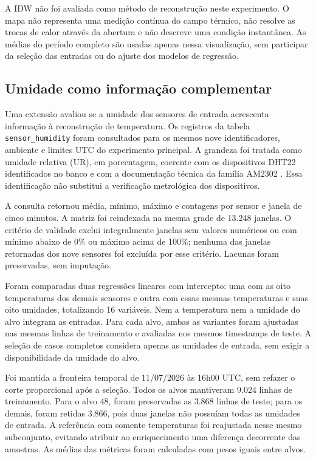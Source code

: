 A IDW não foi avaliada como método de reconstrução neste experimento.
O mapa não representa uma medição contínua do campo térmico, não
resolve as trocas de calor através da abertura e não descreve uma
condição instantânea. As médias do período completo são usadas apenas
nessa visualização, sem participar da seleção das entradas ou do ajuste
dos modelos de regressão.

\subsection{Umidade como informação complementar}
\label{subsec:metodologia_umidade}

Uma extensão avaliou se a umidade dos sensores de entrada acrescenta
informação à reconstrução de temperatura. Os registros da tabela
\texttt{sensor\_humidity} foram consultados para os mesmos nove
identificadores, ambiente e limites UTC do experimento principal.
A grandeza foi tratada como umidade relativa (UR), em porcentagem,
coerente com os dispositivos DHT22 identificados no banco e com a
documentação técnica da família AM2302 \cite{aosongam2302}.
Essa identificação não substitui a verificação metrológica dos dispositivos.

A consulta retornou média, mínimo, máximo e contagens por sensor e
janela de cinco minutos. A matriz foi reindexada na mesma grade de
13.248 janelas. O critério de validade exclui integralmente janelas
sem valores numéricos ou com mínimo abaixo de 0\% ou máximo acima
de 100\%; nenhuma das janelas retornadas dos nove sensores foi
excluída por esse critério. Lacunas foram preservadas, sem imputação.

Foram comparadas duas regressões lineares com intercepto: uma com
as oito temperaturas dos demais sensores e outra com essas mesmas
temperaturas e suas oito umidades, totalizando 16 variáveis. Nem a
temperatura nem a umidade do alvo integram as entradas. Para cada
alvo, ambas as variantes foram ajustadas nas mesmas linhas de
treinamento e avaliadas nos mesmos timestamps de teste. A seleção
de casos completos considera apenas as umidades de entrada,
sem exigir a disponibilidade da umidade do alvo.

Foi mantida a fronteira temporal de 11/07/2026 às 16h00 UTC, sem
refazer o corte proporcional após a seleção. Todos os alvos mantiveram
9.024 linhas de treinamento. Para o alvo 48, foram preservadas as
3.868 linhas de teste; para os demais, foram retidas 3.866, pois duas
janelas não possuíam todas as umidades de entrada. A referência com
somente temperaturas foi reajustada nesse mesmo subconjunto, evitando
atribuir ao enriquecimento uma diferença decorrente das amostras.
As médias das métricas foram calculadas com pesos iguais entre alvos.

